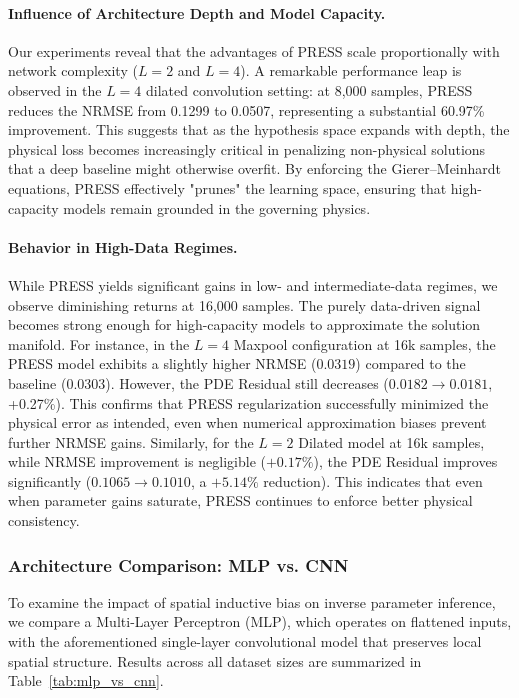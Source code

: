 \documentclass{article} %
\begin{document}
\paragraph{Influence of Architecture Depth and Model Capacity.}

Our experiments reveal that the advantages of PRESS scale proportionally with network complexity ($L=2$ and $L=4$). A remarkable performance leap is observed in the $L=4$ dilated convolution setting: at 8,000 samples, PRESS reduces the NRMSE from 0.1299 to 0.0507, representing a substantial 60.97\% improvement. This suggests that as the hypothesis space expands with depth, the physical loss becomes increasingly critical in penalizing non-physical solutions that a deep baseline might otherwise overfit. By enforcing the Gierer–Meinhardt equations, PRESS effectively "prunes" the learning space, ensuring that high-capacity models remain grounded in the governing physics.

\paragraph{Behavior in High-Data Regimes.}

While PRESS yields significant gains in low- and intermediate-data regimes, we observe diminishing returns at 16,000 samples. The purely data-driven signal becomes strong enough for high-capacity models to approximate the solution manifold. 
For instance, in the $L=4$ Maxpool configuration at 16k samples, the PRESS model exhibits a slightly higher NRMSE ($0.0319$) compared to the baseline ($0.0303$). However, the PDE Residual still decreases ($0.0182 \to 0.0181$, +0.27\%). This confirms that PRESS regularization successfully minimized the physical error as intended, even when numerical approximation biases prevent further NRMSE gains. Similarly, for the $L=2$ Dilated model at 16k samples, while NRMSE improvement is negligible ($+0.17\%$), the PDE Residual improves significantly ($0.1065 \to 0.1010$, a $+5.14\%$ reduction). This indicates that even when parameter gains saturate, PRESS continues to enforce better physical consistency.

\subsubsection{Architecture Comparison: MLP vs. CNN}

To examine the impact of spatial inductive bias on inverse parameter inference, we compare a Multi-Layer Perceptron (MLP), which operates on flattened inputs, with the aforementioned single-layer convolutional model that preserves local spatial structure. Results across all dataset sizes are summarized in Table~\ref{tab:mlp_vs_cnn}.
\end{document}
